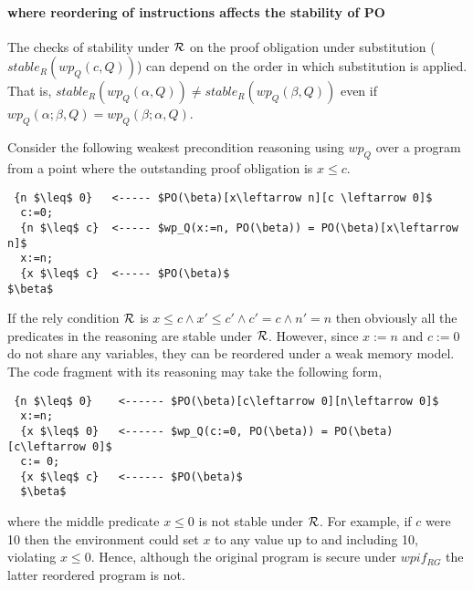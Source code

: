 \paragraph{ where reordering of instructions affects the stability of PO}

The checks of stability under $\mathcal{R}$ on the proof obligation under substitution ($stable_R(wp_Q(c,Q))$) can depend on the order in which substitution is applied. That is, $stable_R(wp_Q(\alpha,Q))\neq stable_R(wp_Q(\beta,Q))$ even if $wp_Q(\alpha;\beta, Q)=wp_Q(\beta;\alpha, Q)$.

Consider the following weakest precondition reasoning using $wp_Q$ over a program from a point where the outstanding proof obligation is $x \leq c$.
  
\begin{lstlisting}
 {n $\leq$ 0}   <----- $PO(\beta)[x\leftarrow n][c \leftarrow 0]$
  c:=0; 
  {n $\leq$ c}  <----- $wp_Q(x:=n, PO(\beta)) = PO(\beta)[x\leftarrow n]$
  x:=n;
  {x $\leq$ c}  <----- $PO(\beta)$
$\beta$ 
\end{lstlisting}
If the rely condition $\mathcal{R}$ is $x \leq c \land x'\leq c' \land c'=c \land n'=n$ then obviously all the predicates in the reasoning are stable under $\mathcal{R}$. However, since $x:=n$ and $c:=0$ do not share any variables, they can be reordered under a weak memory model. The code fragment with its reasoning may take the following form,

\begin{lstlisting}
 {n $\leq$ 0}    <------ $PO(\beta)[c\leftarrow 0][n\leftarrow 0]$
  x:=n; 
  {x $\leq$ 0}   <------ $wp_Q(c:=0, PO(\beta)) = PO(\beta)[c\leftarrow 0]$
  c:= 0;
  {x $\leq$ c}   <------ $PO(\beta)$
  $\beta$
\end{lstlisting}
where the middle predicate $x \leq 0$ is not stable under $\mathcal{R}$. For example, if $c$ were 10 then the environment could set $x$ to any value up to and including 10, violating $x \leq 0$.  Hence, although the original program is secure under $wpi\!f_{RG}$ the latter reordered program is not.



